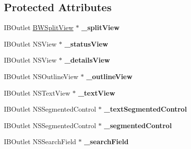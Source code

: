 \subsection*{\-Protected \-Attributes}
\begin{DoxyCompactItemize}
\item 
\hypertarget{interface_g_h_test_view_controller_a5d94632d359c529600eb26d16e7c8348}{
\-I\-B\-Outlet \hyperlink{interface_b_w_split_view}{\-B\-W\-Split\-View} $\ast$ {\bfseries \-\_\-split\-View}}
\label{interface_g_h_test_view_controller_a5d94632d359c529600eb26d16e7c8348}

\item 
\hypertarget{interface_g_h_test_view_controller_a81a3133a2329f74128f71346bf2c8a66}{
\-I\-B\-Outlet \-N\-S\-View $\ast$ {\bfseries \-\_\-status\-View}}
\label{interface_g_h_test_view_controller_a81a3133a2329f74128f71346bf2c8a66}

\item 
\hypertarget{interface_g_h_test_view_controller_a0619a88c2a05c001b702a16289925f6a}{
\-I\-B\-Outlet \-N\-S\-View $\ast$ {\bfseries \-\_\-details\-View}}
\label{interface_g_h_test_view_controller_a0619a88c2a05c001b702a16289925f6a}

\item 
\hypertarget{interface_g_h_test_view_controller_aea256f7551154e0bfa72913c192f1dce}{
\-I\-B\-Outlet \-N\-S\-Outline\-View $\ast$ {\bfseries \-\_\-outline\-View}}
\label{interface_g_h_test_view_controller_aea256f7551154e0bfa72913c192f1dce}

\item 
\hypertarget{interface_g_h_test_view_controller_aba15d846bb1b9e811423dca5b3d749fd}{
\-I\-B\-Outlet \-N\-S\-Text\-View $\ast$ {\bfseries \-\_\-text\-View}}
\label{interface_g_h_test_view_controller_aba15d846bb1b9e811423dca5b3d749fd}

\item 
\hypertarget{interface_g_h_test_view_controller_aa55e6a0540cc90c9e4c9b96871e16fbe}{
\-I\-B\-Outlet \-N\-S\-Segmented\-Control $\ast$ {\bfseries \-\_\-text\-Segmented\-Control}}
\label{interface_g_h_test_view_controller_aa55e6a0540cc90c9e4c9b96871e16fbe}

\item 
\hypertarget{interface_g_h_test_view_controller_a576d73de74a5549faa15425622381a5e}{
\-I\-B\-Outlet \-N\-S\-Segmented\-Control $\ast$ {\bfseries \-\_\-segmented\-Control}}
\label{interface_g_h_test_view_controller_a576d73de74a5549faa15425622381a5e}

\item 
\hypertarget{interface_g_h_test_view_controller_aef127acb5a56c6aa1fbd8af806f23c7f}{
\-I\-B\-Outlet \-N\-S\-Search\-Field $\ast$ {\bfseries \-\_\-search\-Field}}
\label{interface_g_h_test_view_controller_aef127acb5a56c6aa1fbd8af806f23c7f}


\end{DoxyCompactItemize}
